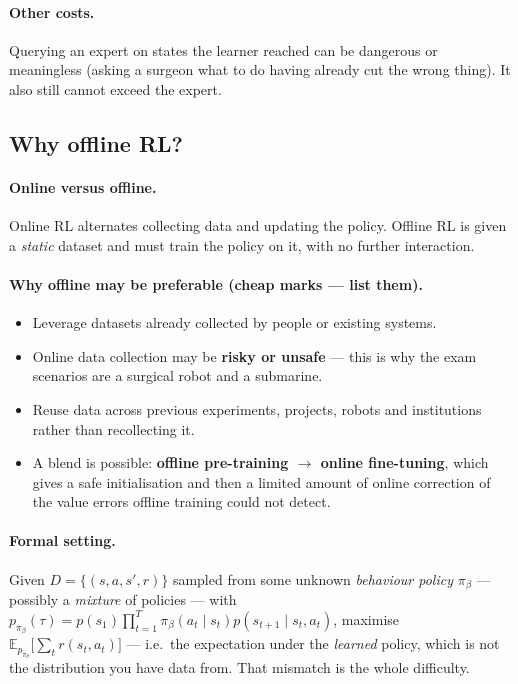 \documentclass[11pt,a4paper]{article}
\begin{document}
\paragraph{Other costs.} Querying an expert on states the learner reached can
be dangerous or meaningless (asking a surgeon what to do having already cut
the wrong thing). It also still cannot exceed the expert.

\subsection{Why offline RL?}

\paragraph{Online versus offline.} Online RL alternates collecting data and
updating the policy. Offline RL is given a \emph{static} dataset and must
train the policy on it, with no further interaction.

\paragraph{Why offline may be preferable (cheap marks --- list them).}
\begin{itemize}
\item Leverage datasets already collected by people or existing systems.
\item Online data collection may be \textbf{risky or unsafe} --- this is why
the exam scenarios are a surgical robot and a submarine.
\item Reuse data across previous experiments, projects, robots and
institutions rather than recollecting it.
\item A blend is possible: \textbf{offline pre-training $\rightarrow$ online
fine-tuning}, which gives a safe initialisation and then a limited amount of
online correction of the value errors offline training could not detect.
\end{itemize}

\paragraph{Formal setting.} Given
$D=\{(s,a,s',r)\}$ sampled from some unknown \emph{behaviour policy}
$\pi_\beta$ --- possibly a \emph{mixture} of policies --- with
$p_{\pi_\beta}(\tau)=p(s_1)\prod_{t=1}^T\pi_\beta(a_t\mid s_t)p(s_{t+1}\mid s_t,a_t)$,
maximise $\mathbb E_{p_{\pi_\theta}}\bigl[\sum_t r(s_t,a_t)\bigr]$ ---
i.e.\ the expectation under the \emph{learned} policy, which is not the
distribution you have data from. That mismatch is the whole difficulty.
\end{document}

